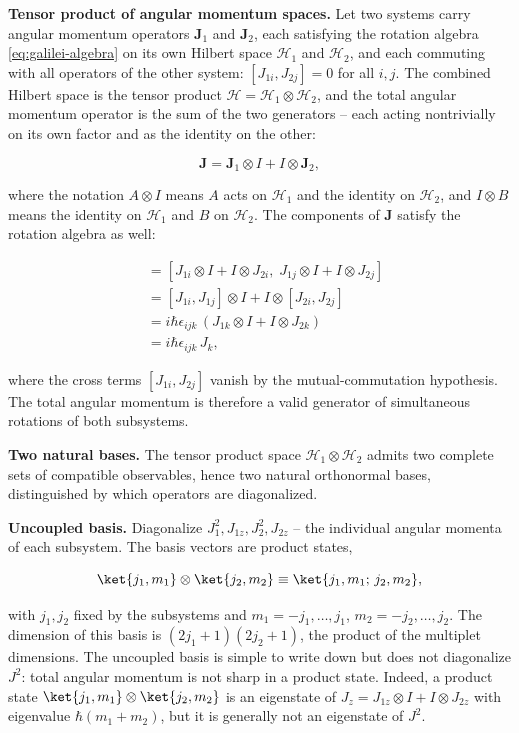 \medskip\noindent\textbf{Tensor product of angular momentum spaces.}
Let two systems carry angular momentum operators $\bm J_1$ and $\bm J_2$, each satisfying the rotation algebra \eqref{eq:galilei-algebra} on its own Hilbert space $\mathcal{H}_1$ and $\mathcal{H}_2$, and each commuting with all operators of the other system: $[J_{1i}, J_{2j}] = 0$ for all $i,j$. The combined Hilbert space is the tensor product $\mathcal{H} = \mathcal{H}_1 \otimes \mathcal{H}_2$, and the total angular momentum operator is the sum of the two generators -- each acting nontrivially on its own factor and as the identity on the other:
\begin{linenomath}
  \begin{equation}
    \bm J = \bm J_1 \otimes I + I \otimes \bm J_2,
    \label{eq:total-J}
  \end{equation}
\end{linenomath}
where the notation $A \otimes I$ means $A$ acts on $\mathcal{H}_1$ and the identity on $\mathcal{H}_2$, and $I \otimes B$ means the identity on $\mathcal{H}_1$ and $B$ on $\mathcal{H}_2$. The components of $\bm J$ satisfy the rotation algebra as well:
\begin{linenomath}
  \begin{align}
    [J_i, J_j]
    &= [J_{1i} \otimes I + I \otimes J_{2i},\;
       J_{1j} \otimes I + I \otimes J_{2j}] \nonumber\\
    &= [J_{1i}, J_{1j}] \otimes I + I \otimes [J_{2i}, J_{2j}] \nonumber\\
    &= i\hbar\epsilon_{ijk}\,(J_{1k} \otimes I + I \otimes J_{2k}) \nonumber\\
    &= i\hbar\epsilon_{ijk}\,J_k,
  \end{align}
\end{linenomath}
where the cross terms $[J_{1i}, J_{2j}]$ vanish by the mutual-commutation hypothesis. The total angular momentum is therefore a valid generator of simultaneous rotations of both subsystems.

\medskip\noindent\textbf{Two natural bases.}
The tensor product space $\mathcal{H}_1 \otimes \mathcal{H}_2$ admits two complete sets of compatible observables, hence two natural orthonormal bases, distinguished by which operators are diagonalized.

\textbf{Uncoupled basis.} Diagonalize $J_1^2, J_{1z}, J_2^2, J_{2z}$ -- the individual angular momenta of each subsystem. The basis vectors are product states,
\begin{linenomath}
  \begin{equation}
    \ket{j_1,m_1} \otimes \ket{j_2,m_2}
    \equiv \ket{j_1,m_1;\,j_2,m_2},
  \end{equation}
\end{linenomath}
with $j_1,j_2$ fixed by the subsystems and $m_1 = -j_1,\ldots,j_1$, $m_2 = -j_2,\ldots,j_2$. The dimension of this basis is $(2j_1+1)(2j_2+1)$, the product of the multiplet dimensions. The uncoupled basis is simple to write down but does not diagonalize $J^2$: total angular momentum is not sharp in a product state. Indeed, a product state $\ket{j_1,m_1}\otimes\ket{j_2,m_2}$ is an eigenstate of $J_z = J_{1z} \otimes I + I \otimes J_{2z}$ with eigenvalue $\hbar(m_1+m_2)$, but it is generally not an eigenstate of $J^2$.

